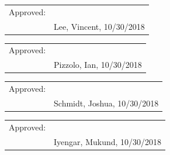 \documentclass{article}
\begin{document}
\bigskip
\bigskip
\bigskip

\begin{tabular}{@{}p{.5in}p{3.5in}@{}}
Approved: & \hrulefill \\
& Lee, Vincent, 10/30/2018\\
\end{tabular}

\bigskip
\bigskip
\bigskip

\begin{tabular}{@{}p{.5in}p{3.5in}@{}}
Approved: & \hrulefill \\
& Pizzolo, Ian, 10/30/2018\\
\end{tabular}

\bigskip
\bigskip
\bigskip

\begin{tabular}{@{}p{.5in}p{3.5in}@{}}
Approved: & \hrulefill \\
& Schmidt, Joshua, 10/30/2018\\
\end{tabular}

\bigskip
\bigskip
\bigskip

\begin{tabular}{@{}p{.5in}p{3.5in}@{}}
Approved: & \hrulefill \\
& Iyengar, Mukund, 10/30/2018\\
\end{tabular}
\end{document}
